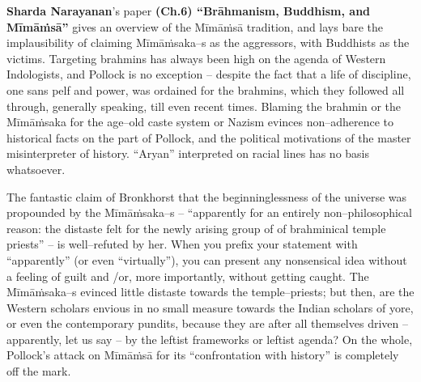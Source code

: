 \textbf{Sharda Narayanan}’s paper \textbf{(Ch.6) “Brāhmanism, Buddhism, and Mīmāṁsā”} gives an overview of the Mīmāṁsā tradition, and lays bare the implausibility of claiming Mīmāṁsaka–s as the aggressors, with Buddhists as the victims. Targeting brahmins has always been high on the agenda of Western Indologists, and Pollock is no exception – despite the fact that a life of discipline, one sans pelf and power, was ordained for the brahmins, which they followed all through, generally speaking, till even recent times. Blaming the brahmin or the Mīmāṁsaka for the age–old caste system or Nazism evinces non–adherence to historical facts on the part of Pollock, and the political motivations of the master misinterpreter of history. “Aryan” interpreted on racial lines has no basis whatsoever.

The fantastic claim of Bronkhorst that the beginninglessness of the universe was propounded by the Mīmāṁsaka–s – “apparently for an entirely non–philosophical reason: the distaste felt for the newly arising group of of brahminical temple priests” – is well–refuted by her. When you prefix your statement with “apparently” (or even “virtually”), you can present any nonsensical idea without a feeling of guilt and /or, more importantly, without getting caught. The Mīmāṁsaka–s evinced little distaste towards the temple–priests; but then, are the Western scholars envious in no small measure towards the Indian scholars of yore, or even the contemporary pundits, because they are after all themselves driven – apparently, let us say – by the leftist frameworks or leftist agenda? On the whole, Pollock’s attack on Mīmāṁsā for its “confrontation with history” is completely off the mark.


